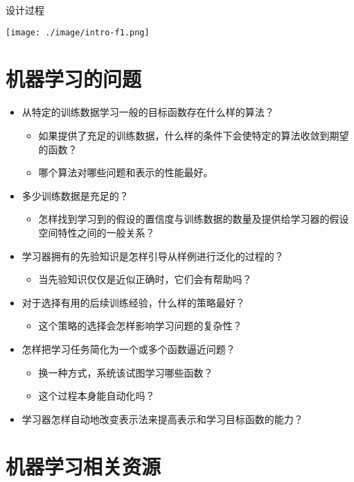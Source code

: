 \documentclass[presentation]{beamer}
\begin{document}
\begin{frame}[label={sec:org9d4cde3}]{设计过程}
\center
\begin{center}
\texttt{[image: ./image/intro-f1.png]}
\end{center}
\end{frame}

\section{机器学习的问题}
\label{sec:org8f8f2ee}

\begin{itemize}
\item 从特定的训练数据学习一般的目标函数存在什么样的算法？
\begin{itemize}
\item 如果提供了充足的训练数据，什么样的条件下会使特定的算法收敛到期望的函数？
\item 哪个算法对哪些问题和表示的性能最好。
\end{itemize}
\item 多少训练数据是充足的？
\begin{itemize}
\item 怎样找到学习到的假设的置信度与训练数据的数量及提供给学习器的假设空间特性之间的一般关系？
\end{itemize}
\item 学习器拥有的先验知识是怎样引导从样例进行泛化的过程的？
\begin{itemize}
\item 当先验知识仅仅是近似正确时，它们会有帮助吗？
\end{itemize}
\item 对于选择有用的后续训练经验，什么样的策略最好？
\begin{itemize}
\item 这个策略的选择会怎样影响学习问题的复杂性？
\end{itemize}
\item 怎样把学习任务简化为一个或多个函数逼近问题？
\begin{itemize}
\item 换一种方式，系统该试图学习哪些函数？
\item 这个过程本身能自动化吗？
\end{itemize}
\item 学习器怎样自动地改变表示法来提高表示和学习目标函数的能力？
\end{itemize}

\section{机器学习相关资源}
\label{sec:org52ed6bb}
\end{document}
